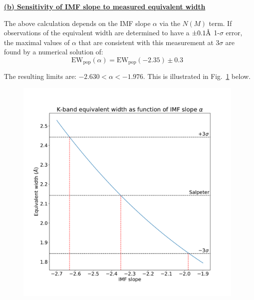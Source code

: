 \documentclass{article}
\newcommand{\angstrom}{\mbox{\normalfont\AA}}
\begin{document}
\underline{\bf{(b)} Sensitivity of IMF slope to measured equivalent width}

The above calculation depends on the IMF slope $\alpha$ via the $N(M)$ term. If observations of the equivalent width are determined to have a $\pm 0.1\angstrom$ 1-$\sigma$ error, the maximal values of $\alpha$ that are consistent with this measurement at 3$\sigma$ are found by a numerical solution of:
\begin{equation}
  \mathrm{EW}_{\mathrm{pop}}(\alpha)=\mathrm{EW}_{\mathrm{pop}}(-2.35)\pm 0.3
\end{equation}

The resulting limits are: $-2.630<\alpha<-1.976$. This is illustrated in Fig.~\ref{fig:alpha} below.
\begin{figure}[h]
  \centering
  \includegraphics[width=\textwidth]{imf_slope_3sigma.pdf}
  \caption{}
  \label{fig:alpha}
\end{figure}
\end{document}
